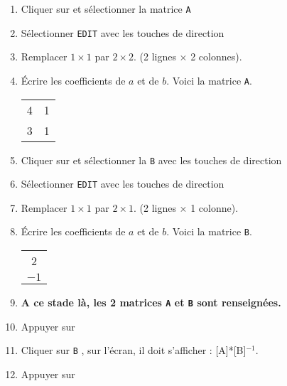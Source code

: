\begin{enumerate}
\item Cliquer sur   et sélectionner la matrice \texttt{A}
\item Sélectionner \texttt{EDIT} avec les touches de direction

\item Remplacer $ 1 \times 1$ par $2 \times 2$. (2 lignes $\times$ 2 colonnes).
\item Écrire les coefficients de $a$ et de $b$. Voici la matrice \texttt{A}.

\begin{tabular}{cc}
 4 & 1 \\ 
3 & 1 \\ 
\end{tabular} 

\item Cliquer sur   et sélectionner la \texttt{B} avec les touches de direction
\item Sélectionner \texttt{EDIT} avec les touches de direction

\item Remplacer $ 1 \times 1$ par $2 \times 1$. (2 lignes $\times$ 1 colonne).
\item Écrire les coefficients de $a$ et de $b$. Voici la matrice \texttt{B}.

\begin{tabular}{c}
2  \\ 
$-1$ \\ 
\end{tabular} 

\item \textbf{A ce stade là, les 2 matrices \texttt{A} et \texttt{B} sont renseignées.}

\item Appuyer sur   

\item Cliquer sur     \touche{$\times$}   \texttt{B} , sur l'écran, il doit s'afficher : [A]*[B]$^{-1}$.

\item Appuyer sur 

\end{enumerate}




